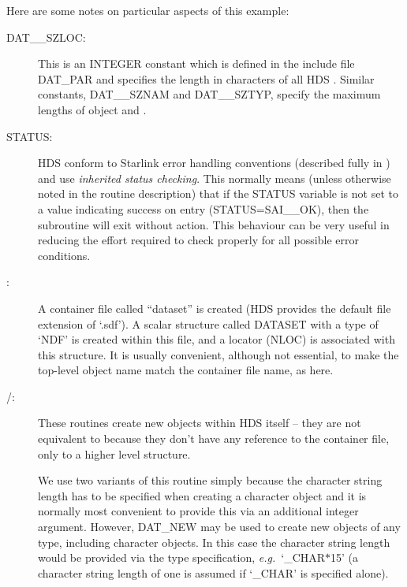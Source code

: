 \documentclass[twoside,11pt]{starlink}
\providecommand{\qt}[1]{``#1''}
\providecommand{\st}[1]{{\emph{#1}}}
\providecommand{\astar}[0]{{$*$}}
\begin{document}
Here are some notes on particular aspects of this example:

\begin{description}

\item [DAT\_\_SZLOC:]
This is an INTEGER constant which is defined in the include file
DAT\_PAR and specifies the length in characters of all HDS
. Similar constants, DAT\_\_SZNAM and DAT\_\_SZTYP, specify
the maximum lengths of object  and
.

\item [STATUS:]
HDS  conform to Starlink error
handling conventions (described fully in ) and
use \st{inherited status checking}. This normally means (unless
otherwise noted in the routine description) that if the STATUS
variable is not set to a value indicating success on entry
(STATUS=SAI\_\_OK), then the subroutine will exit without action. This
behaviour can be very useful in reducing the effort required to check
properly for all possible error conditions.

\item [:]
A container file called \qt{dataset} is created (HDS provides the
default file extension of `.sdf'). A scalar structure called DATASET
with a type of `NDF' is created within this file, and a locator (NLOC)
is associated with this structure. It is usually convenient, although
not essential, to make the top-level object name match the container
file name, as here.

\item [/:]
These routines create new objects within HDS itself -- they are not
equivalent to  because they don't have any
reference to the container file, only to a higher level structure.

We use two variants of this routine simply because the character
string length has to be specified when creating a character object and
it is normally most convenient to provide this via an additional
integer argument.  However, DAT\_NEW may be used to create new objects
of any type, including character objects. In this case the character
string length would be provided via the type specification, \st{e.g.}\
`\_CHAR{\astar}15' (a character string length of one is assumed if
`\_CHAR' is specified alone).


\end{description}
\end{document}
